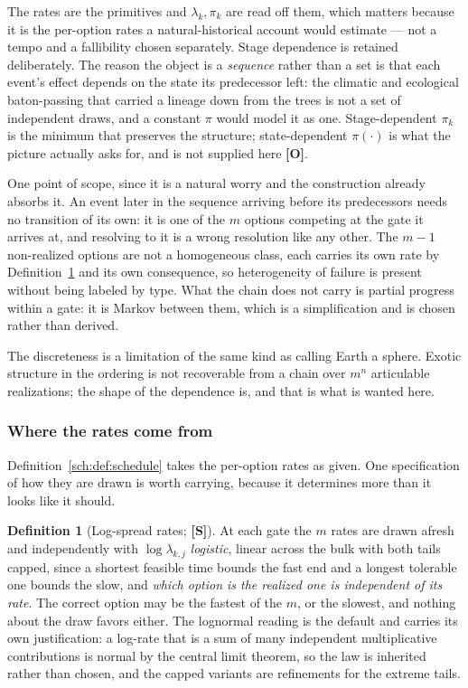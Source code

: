 \documentclass[11pt]{article}
\numberwithin{equation}{section}
\theoremstyle{plain}
\theoremstyle{definition}
\newtheorem{definition}[theorem]{Definition}
\theoremstyle{remark}
\begin{document}
The rates are the primitives and $\lambda_k,\pi_k$ are read off them,
which matters because it is the per-option rates a natural-historical
account would estimate --- not a tempo and a fallibility chosen
separately. Stage dependence is retained deliberately. The reason the object is a
\emph{sequence} rather than a set is that each event's effect depends on
the state its predecessor left: the climatic and ecological
baton-passing that carried a lineage down from the trees is not a set of
independent draws, and a constant $\pi$ would model it as one.
Stage-dependent $\pi_k$ is the minimum that preserves the structure;
state-dependent $\pi(\cdot)$ is what the picture actually asks for, and
is not supplied here \textbf{[O]}.

One point of scope, since it is a natural worry and the construction
already absorbs it. An event later in the sequence arriving before its
predecessors needs no transition of its own: it is one of the $m$
options competing at the gate it arrives at, and resolving to it is a
wrong resolution like any other. The $m-1$ non-realized options are not
a homogeneous class, each carries its own rate by
Definition~\ref{sch:def:rates} and its own consequence, so
heterogeneity of failure is present without being labeled by type. What
the chain does not carry is partial progress within a gate: it is Markov
between them, which is a simplification and is chosen rather than
derived.

The discreteness is a limitation of the same kind as calling Earth a
sphere. Exotic structure in the ordering is not recoverable from a chain
over $m^n$ articulable realizations; the shape of the dependence is, and
that is what is wanted here.

\subsubsection{Where the rates come from}\label{sch:subsub:rates}

Definition~\ref{sch:def:schedule} takes the per-option rates as given.
One specification of how they are drawn is worth carrying, because it
determines more than it looks like it should.

\begin{definition}[Log-spread rates; \textbf{[S]}]\label{sch:def:rates}
At each gate the $m$ rates are drawn afresh and independently with
$\log\lambda_{k,j}$ \emph{logistic}, linear across the bulk with both
tails capped, since a shortest feasible time bounds the fast end and a
longest tolerable one bounds the slow, and \emph{which option is the realized one is
independent of its rate}. The correct option may be the fastest of the
$m$, or the slowest, and nothing about the draw favors either. The
lognormal reading is the default and carries its own justification: a
log-rate that is a sum of many independent multiplicative contributions
is normal by the central limit theorem, so the law is inherited rather
than chosen, and the capped variants are refinements for the extreme
tails.
\end{definition}
\end{document}

